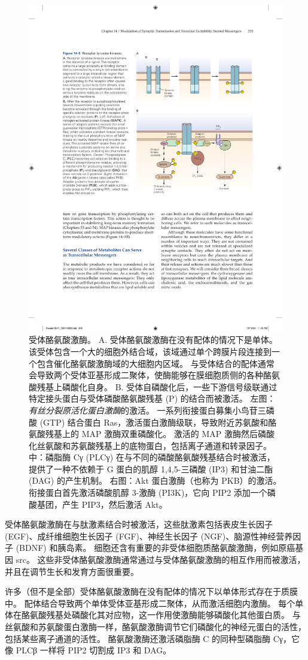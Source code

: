 \begin{figure}[htbp]
	\centering
	\includegraphics[width=0.7\linewidth]{chap14/fig_14_5}
	\caption{受体酪氨酸激酶。 A. 受体酪氨酸激酶在没有配体的情况下是单体。 该受体包含一个大的细胞外结合域，该域通过单个跨膜片段连接到一个包含催化酪氨酸激酶域的大细胞内区域。 与受体结合的配体通常会导致两个受体亚基形成二聚体，使酶能够在膜细胞质侧的各种酪氨酸残基上磷酸化自身。 B. 受体自磷酸化后，一些下游信号级联通过特定接头蛋白与受体磷酸酪氨酸残基 (P) 的结合而被激活。 左图：\textit{有丝分裂原活化蛋白激酶}的激活。 一系列衔接蛋白募集小鸟苷三磷酸 (GTP) 结合蛋白 Ras，激活蛋白激酶级联，导致附近苏氨酸和酪氨酸残基上的 MAP 激酶双重磷酸化。 激活的 MAP 激酶然后磷酸化丝氨酸和苏氨酸残基上的底物蛋白，包括离子通道和转录因子。 中：磷脂酶 Cγ (PLCγ) 在与不同的磷酸酪氨酸残基结合时被激活，提供了一种不依赖于 G 蛋白的肌醇 1,4,5-三磷酸 (IP3) 和甘油二酯 (DAG) 的产生机制。 右图：Akt 蛋白激酶（也称为 PKB）的激活。 衔接蛋白首先激活磷酸肌醇 3-激酶 (PI3K)，它向 PIP2 添加一个磷酸基团，产生 PIP3，然后激活 Akt。}
	\label{fig:14_5}
\end{figure}


受体酪氨酸激酶在与肽激素结合时被激活，这些肽激素包括表皮生长因子 (EGF)、成纤维细胞生长因子 (FGF)、神经生长因子 (NGF)、脑源性神经营养因子 (BDNF) 和胰岛素。
细胞还含有重要的非受体细胞质酪氨酸激酶，例如原癌基因 src。
这些非受体酪氨酸激酶通常通过与受体酪氨酸激酶的相互作用而被激活，并且在调节生长和发育方面很重要。


许多（但不是全部）受体酪氨酸激酶在没有配体的情况下以单体形式存在于质膜中。
配体结合导致两个单体受体亚基形成二聚体，从而激活细胞内激酶。
每个单体在酪氨酸残基处磷酸化其对应物，这一作用使激酶能够磷酸化其他蛋白质。
与丝氨酸和苏氨酸蛋白激酶一样，酪氨酸激酶调节它们磷酸化的神经元蛋白的活性，包括某些离子通道的活性。
酪氨酸激酶还激活磷脂酶 C 的同种型磷脂酶 Cγ，它像 PLCβ 一样将 PIP2 切割成 IP3 和 DAG。


